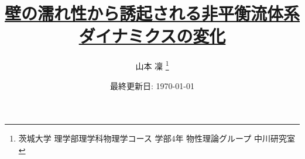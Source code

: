 \documentclass[dvipdfmx]{jsreport}
\begin{document}
\title{\href{https://github.com/m-agnet/Report.git}{壁の濡れ性から誘起される非平衡流体系ダイナミクスの変化}}
\author{山本 凜 \thanks{茨城大学 理学部理学科物理学コース 学部4年 物性理論グループ 中川研究室}}
\date{最終更新日: \today}
\maketitle
\newpage

\setcounter{tocdepth}{3}
\tableofcontents
\newpage








\appendix






\end{document}
